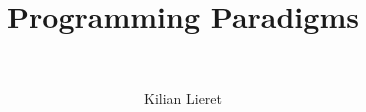 %
\title{Programming Paradigms}
\subtitle{\ \relax}
\author{Kilian Lieret}
\newcommand*{\coauthors}{}
%
%
%